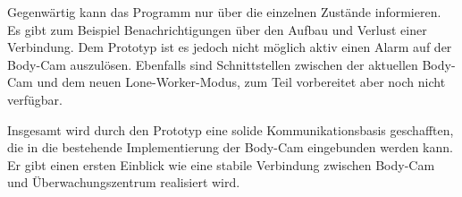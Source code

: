 \documentclass[thesis.tex]{subfiles}
\begin{document}
Gegenwärtig kann das Programm nur über die einzelnen Zustände informieren.
Es gibt zum Beispiel Benachrichtigungen über den Aufbau und Verlust einer Verbindung.
Dem Prototyp ist es jedoch nicht möglich aktiv einen Alarm auf der Body-Cam auszulösen.
Ebenfalls sind Schnittstellen zwischen der aktuellen Body-Cam und dem neuen Lone-Worker-Modus, zum Teil vorbereitet aber noch nicht verfügbar.

Insgesamt wird durch den Prototyp eine solide Kommunikationsbasis geschafften, die in die bestehende Implementierung der Body-Cam eingebunden werden kann.
Er gibt einen ersten Einblick wie eine stabile Verbindung zwischen Body-Cam und Überwachungszentrum realisiert wird.

\subfilebib %
\end{document}

